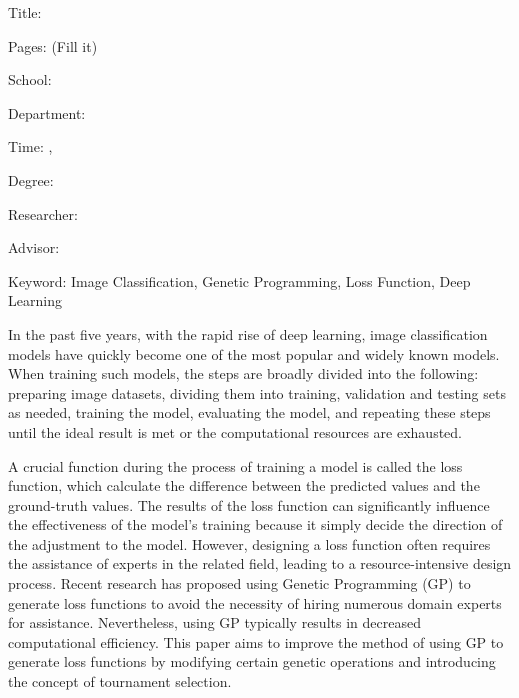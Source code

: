 \begin{EnAbstract}
    \begin{EnAbstractItems}
        \noindent \text Title: \eTitle

        \noindent \text Pages: (Fill it)

        \noindent \text School: \univEname

        \noindent \text Department: \deptEname

        \noindent \text Time: \eMonth, \eYear

        \noindent \text Degree: \degreeEname

        \noindent \text Researcher: \myEname

        \noindent \text Advisor: \advisorEname
        
        \noindent \text Keyword: Image Classification, Genetic Programming, Loss Function, Deep Learning

    \end{EnAbstractItems}

    \begin{EnAbstractDescription}
        In the past five years, with the rapid rise of deep learning, image classification models have quickly become one of the most popular and widely known models. When training such models, the steps are broadly divided into the following: preparing image datasets, dividing them into training, validation and testing sets as needed, training the model, evaluating the model, and repeating these steps until the ideal result is met or the computational resources are exhausted.
        
        A crucial function during the process of training a model is called the loss function, which calculate the difference between the predicted values and the ground-truth values. The results of the loss function can significantly influence the effectiveness of the model's training because it simply decide the direction of the adjustment to the model. However, designing a loss function often requires the assistance of experts in the related field, leading to a resource-intensive design process. Recent research has proposed using Genetic Programming (GP) to generate loss functions to avoid the necessity of hiring numerous domain experts for assistance. Nevertheless, using GP typically results in decreased computational efficiency. This paper aims to improve the method of using GP to generate loss functions by modifying certain genetic operations and introducing the concept of tournament selection.
    \end{EnAbstractDescription}
    
\end{EnAbstract}

